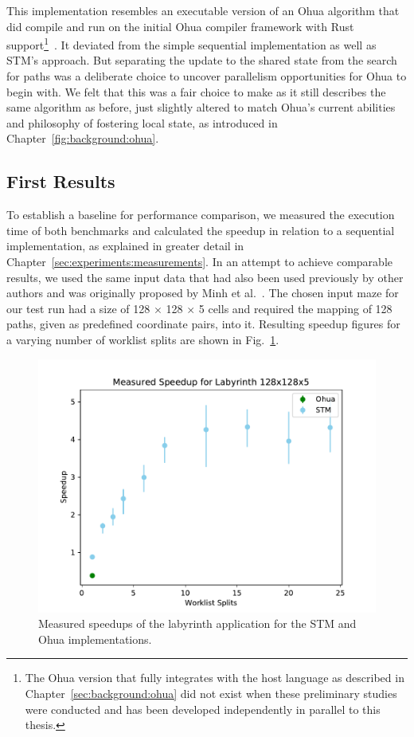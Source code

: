 This implementation resembles an executable version of an Ohua algorithm that did compile and run on the initial Ohua compiler framework with Rust support\footnote{The Ohua version that fully integrates with the host language as described in Chapter~\ref{sec:background:ohua} did not exist when these preliminary studies were conducted and has been developed independently in parallel to this thesis.}~\cite{ertel2020ohuarustrt}.
It deviated from the simple sequential implementation as well as STM's approach.
But separating the update to the shared state from the search for paths was a deliberate choice to uncover parallelism opportunities for Ohua to begin with.
We felt that this was a fair choice to make as it still describes the same algorithm as before, just slightly altered to match Ohua's current abilities and philosophy of fostering local state, as introduced in Chapter~\ref{fig:background:ohua}.

\subsection{First Results}

To establish a baseline for performance comparison, we measured the execution time of both benchmarks and calculated the speedup in relation to a sequential implementation, as explained in greater detail in Chapter~\ref{sec:experiments:measurements}.
In an attempt to achieve comparable results, we used the same input data that had also been used previously by other authors and was originally proposed by Minh et al.~\cite{minh2008stamp}.
The chosen input maze for our test run had a size of 128 $\times$ 128 $\times$ 5 cells and required the mapping of 128 paths, given as predefined coordinate pairs, into it.
Resulting speedup figures for a varying number of worklist splits are shown in Fig.~\ref{fig:preliminaries:initial-results}.

\begin{figure}[h]
    \centering
    \includegraphics[width=.5\textwidth,keepaspectratio]{gfx/preliminaries-labyrinth/2019-04-18-128x128x5}
    \caption{Measured speedups of the labyrinth application for the STM and Ohua implementations.}%
    \label{fig:preliminaries:initial-results}
\end{figure}

